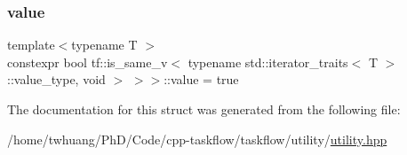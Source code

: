 \subsubsection{\texorpdfstring{value}{value}}
{\footnotesize\ttfamily template$<$typename T $>$ \\
constexpr bool tf\+::is\+\_\+same\+\_\+v$<$ typename std\+::iterator\+\_\+traits$<$ T $>$\+::value\+\_\+type, void $>$ $>$$>$\+::value = true\hspace{0.3cm}{\ttfamily [static]}}



The documentation for this struct was generated from the following file\+:\begin{DoxyCompactItemize}
\item 
/home/twhuang/\+Ph\+D/\+Code/cpp-\/taskflow/taskflow/utility/\hyperlink{utility_8hpp}{utility.\+hpp}\end{DoxyCompactItemize}
